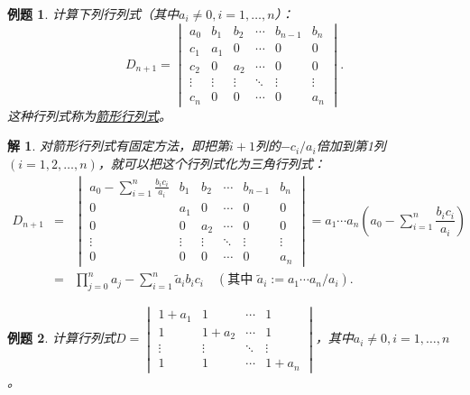\documentclass[a4paper]{book}
\newtheorem{eg}{例题}[chapter]
\newtheorem*{solution}{解}
\begin{document}
\begin{eg}
计算下列行列式（其中$a_i \neq 0, i = 1,…, n$）：
$$D_{n+1} = \begin{vmatrix}
a_0 & b_1 & b_2 & \cdots & b_{n-1} & b_n \\ c_1 & a_1 & 0 & \cdots & 0 & 0 \\ c_2 & 0 & a_2 & \cdots & 0 & 0 \\ \vdots & \vdots & \vdots & \ddots & \vdots & \vdots \\ c_n & 0 & 0 & \cdots & 0 & a_n \end{vmatrix}.$$
这种行列式称为\underline{箭形行列式}。
\end{eg}

\begin{solution}
对箭形行列式有固定方法，即把第$i+1$列的$-c_i/a_i$倍加到第1列$(i=1,2,…,n)$，就可以把这个行列式化为三角行列式：
\begin{eqnarray*}
D_{n+1} & = & \begin{vmatrix}
a_0 - \sum\limits_{i=1}^n\frac{b_ic_i}{a_i} & b_1 & b_2 & \cdots & b_{n-1} & b_n \\ 0 & a_1 & 0 & \cdots & 0 & 0 \\ 0 & 0 & a_2 & \cdots & 0 & 0 \\ \vdots & \vdots & \vdots & \ddots & \vdots & \vdots \\ 0 & 0 & 0 & \cdots & 0 & a_n \end{vmatrix} = a_1\cdots a_n\left( a_0 - \sum\limits_{i=1}^n \dfrac{b_ic_i}{a_i} \right) \\
& = & \prod\limits_{j=0}^n a_j - \sum\limits_{i=1}^n \widetilde{a}_ib_ic_i \quad (\text{其中 } \widetilde{a}_i := a_1\cdots a_n / a_i).
\end{eqnarray*}
\end{solution}

\begin{eg}
计算行列式$D = \begin{vmatrix}
1+a_1 & 1 & \cdots & 1 \\ 1 & 1+a_2 & \cdots & 1 \\ \vdots & \vdots & \ddots & \vdots \\ 1 & 1 & \cdots & 1+a_n \end{vmatrix}$，其中$a_i \neq 0, i = 1,…, n$。
\end{eg}
\end{document}
